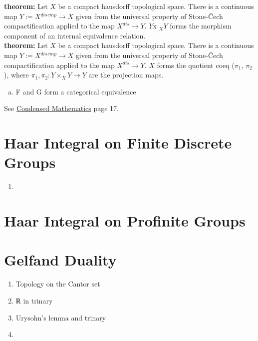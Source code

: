 \documentclass[13pt]{amsart}
\begin{document}
{\bf theorem:} Let $X$ be a compact hausdorff topological space. There is a continuous map $Y := X{}^{dis}{}^{cmp} \rightarrow X$ given from the universal property of Stone-Čech compactification applied to the map $X^{dis} \rightarrow Y$. $Y $x ${}_{X} Y$ forms the morphism component of an internal equivalence relation.\\

{\bf theorem:} Let $X$ be a compact hausdorff topological space. There is a continuous map $Y := X{}^{dis}{}^{cmp} \rightarrow X$ given from the universal property of Stone-Čech compactification applied to the map $X^{dis} \rightarrow Y$. $X$ forms the quotient coeq ($\pi_1$, $\pi_2$), where $\pi_1, \pi_2 : Y \times_{X} Y \rightarrow Y$ are the projection maps.\\


\begin{enumerate}[(a)]
\item F and G form a categorical equivalence
\end{enumerate}

See \href{}{Condensed Mathematics} page 17.\\



\section{Haar Integral on Finite Discrete Groups}

\begin{enumerate}
\item 
\end{enumerate}


\section{Haar Integral on Profinite Groups}



\section{Gelfand Duality}

\begin{enumerate}
\item Topology on the Cantor set
\item ℝ in trinary
\item Urysohn's lemma and trinary
\item 
\end{enumerate}
\end{document}
